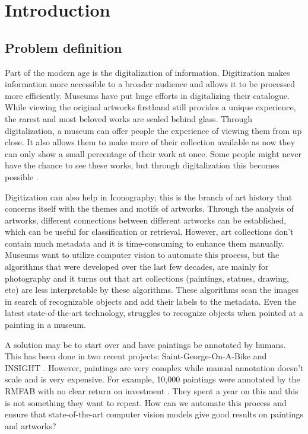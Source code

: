 \chapter{Introduction}
\label{chap:intro}

\section{Problem definition}

Part of the modern age is the digitalization of information.
Digitization makes information more accessible to a broader audience and allows it to be processed more efficiently.
Museums have put huge efforts in digitalizing their catalogue.
While viewing the original artworks firsthand still provides a unique experience, the rarest and most beloved works are sealed behind glass.
Through digitalization, a museum can offer people the experience of viewing them from up close.
It also allows them to make more of their collection available as now they can only show a small percentage of their work at once.
Some people might never have the chance to see these works, but through digitalization this becomes possible \cite{Digitization1}.

Digitization can also help in Iconography; this is the branch of art history that concerns itself with the themes and motifs of artworks.
Through the analysis of artworks, different connections between different artworks can be established, which can be useful for classification or retrieval.
However, art collections don't contain much metadata and it is time-consuming to enhance them manually.
Museums want to utilize computer vision to automate this process, but the algorithms that were developed over the last few decades, are mainly for photography and it turns out that art collections (paintings, statues, drawing, etc) are less interpretable by these algorithms.
These algorithms scan the images in search of recognizable objects and add their labels to the metadata.
Even the latest state-of-the-art technology, struggles to recognize objects when pointed at a painting in a museum.

A solution may be to start over and have paintings be annotated by humans.
This has been done in two recent projects: Saint-George-On-A-Bike \cite{GeorgeOnABike} and INSIGHT \cite{Insight}.
However, paintings are very complex while manual annotation doesn't scale and is very expensive.
For example, 10,000 paintings were annotated by the \gls{RMFAB} with no clear return on investment \cite{RMFAB2024}.
They spent a year on this and this is not something they want to repeat.
How can we automate this process and ensure that state-of-the-art computer vision models give good results on paintings and artworks?  

